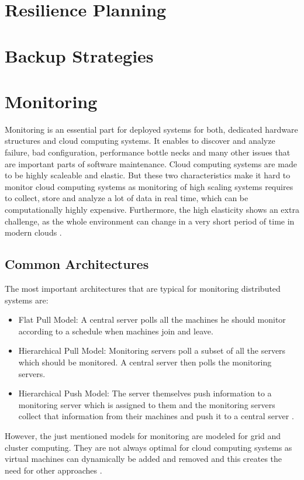 \section{Resilience Planning}

\section{Backup Strategies}

\section{Monitoring}
Monitoring is an essential part for deployed systems for both,  dedicated hardware structures and cloud computing systems. It enables to discover and analyze failure, bad configuration, performance bottle necks and many other issues that are important parts of software maintenance. Cloud computing systems are made to be highly scaleable and elastic. But these two characteristics make it hard to monitor cloud computing systems as monitoring of high scaling systems requires to collect, store and analyze a lot of data in real time, which can be computationally highly expensive. Furthermore, the high elasticity shows an extra challenge, as the whole environment can change in a very short period of time in modern clouds \cite{Ward_2014}.

\subsection{Common Architectures}
The most important architectures that are typical for monitoring distributed systems are:

\begin{itemize}
	\item Flat Pull Model: A central server polls all the machines he should monitor according to a schedule when machines join and leave.
	\item Hierarchical Pull Model: Monitoring servers poll a subset of all the servers which should be monitored. A central server then polls the monitoring servers.
	\item Hierarchical Push Model: The server themselves push information to a monitoring server which is assigned to them and the monitoring servers collect that information from their machines and push it to a central server \cite{Ward_2014}.
\end{itemize}

However, the just mentioned models for monitoring are modeled for grid and cluster computing. They are not always optimal for cloud computing systems as virtual machines can dynamically be added and removed and this creates the need for other approaches \cite{Ward_2014, He_2010}. 

